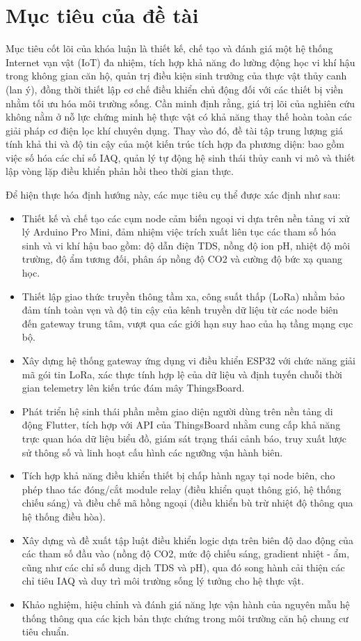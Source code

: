 \section{Mục tiêu của đề tài}
Mục tiêu cốt lõi của khóa luận là thiết kế, chế tạo và đánh giá một hệ thống Internet vạn vật (IoT) đa nhiệm, tích hợp khả năng đo lường động học vi khí hậu trong không gian căn hộ, quản trị điều kiện sinh trưởng của thực vật thủy canh (lan ý), đồng thời thiết lập cơ chế điều khiển chủ động đối với các thiết bị viền nhằm tối ưu hóa môi trường sống. Cần minh định rằng, giá trị lõi của nghiên cứu không nằm ở nỗ lực chứng minh hệ thực vật có khả năng thay thế hoàn toàn các giải pháp cơ điện lọc khí chuyên dụng. Thay vào đó, đề tài tập trung lượng giá tính khả thi và độ tin cậy của một kiến trúc tích hợp đa phương diện: bao gồm việc số hóa các chỉ số IAQ, quản lý tự động hệ sinh thái thủy canh vi mô và thiết lập vòng lặp điều khiển phản hồi theo thời gian thực.

Để hiện thực hóa định hướng này, các mục tiêu cụ thể được xác định như sau:
\begin{itemize}
    \item Thiết kế và chế tạo các cụm node cảm biến ngoại vi dựa trên nền tảng vi xử lý Arduino Pro Mini, đảm nhiệm việc trích xuất liên tục các tham số hóa sinh và vi khí hậu bao gồm: độ dẫn điện TDS, nồng độ ion pH, nhiệt độ môi trường, độ ẩm tương đối, phân áp nồng độ CO2 và cường độ bức xạ quang học.
    \item Thiết lập giao thức truyền thông tầm xa, công suất thấp (LoRa) nhằm bảo đảm tính toàn vẹn và độ tin cậy của kênh truyền dữ liệu từ các node biên đến gateway trung tâm, vượt qua các giới hạn suy hao của hạ tầng mạng cục bộ.
    \item Xây dựng hệ thống gateway ứng dụng vi điều khiển ESP32 với chức năng giải mã gói tin LoRa, xác thực tính hợp lệ của dữ liệu và định tuyến chuỗi thời gian telemetry lên kiến trúc đám mây ThingsBoard.
    \item Phát triển hệ sinh thái phần mềm giao diện người dùng trên nền tảng di động Flutter, tích hợp với API của ThingsBoard nhằm cung cấp khả năng trực quan hóa dữ liệu biểu đồ, giám sát trạng thái cảnh báo, truy xuất lược sử thông số và linh hoạt cấu hình các ngưỡng vận hành biên.
    \item Tích hợp khả năng điều khiển thiết bị chấp hành ngay tại node biên, cho phép thao tác đóng/cắt module relay (điều khiển quạt thông gió, hệ thống chiếu sáng) và điều chế mã hồng ngoại (điều khiển bù trừ nhiệt độ thông qua hệ thống điều hòa).
    \item Xây dựng và đề xuất tập luật điều khiển logic dựa trên biên độ dao động của các tham số đầu vào (nồng độ CO2, mức độ chiếu sáng, gradient nhiệt - ẩm, cũng như các chỉ số dung dịch TDS và pH), qua đó song hành cải thiện các chỉ tiêu IAQ và duy trì môi trường sống lý tưởng cho hệ thực vật.
    \item Khảo nghiệm, hiệu chỉnh và đánh giá năng lực vận hành của nguyên mẫu hệ thống thông qua các kịch bản thực chứng trong môi trường căn hộ chung cư tiêu chuẩn.
\end{itemize}